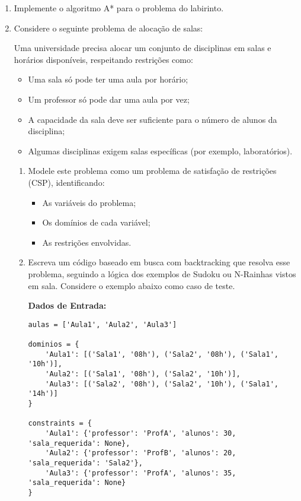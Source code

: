 \documentclass{article}
\begin{document}
\begin{enumerate}
    \item Implemente o algoritmo A* para o problema do labirinto. 
    \item Considere o seguinte problema de alocação de salas:

    Uma universidade precisa alocar um conjunto de disciplinas em salas e horários disponíveis, respeitando restrições como:
    \begin{itemize}
        \item Uma sala só pode ter uma aula por horário;
        \item Um professor só pode dar uma aula por vez;
        \item A capacidade da sala deve ser suficiente para o número de alunos da disciplina;
        \item Algumas disciplinas exigem salas específicas (por exemplo, laboratórios).
    \end{itemize}

    \begin{enumerate}
        \item Modele este problema como um problema de satisfação de restrições (CSP), identificando:
        \begin{itemize}
            \item As variáveis do problema;
            \item Os domínios de cada variável;
            \item As restrições envolvidas.
        \end{itemize}

        \item Escreva um código baseado em busca com backtracking que resolva esse problema, seguindo a lógica dos exemplos de Sudoku ou N-Rainhas vistos em sala. Considere o exemplo abaixo como caso de teste. 


\textbf{Dados de Entrada:}
\begin{verbatim}
aulas = ['Aula1', 'Aula2', 'Aula3']

dominios = {
    'Aula1': [('Sala1', '08h'), ('Sala2', '08h'), ('Sala1', '10h')],
    'Aula2': [('Sala1', '08h'), ('Sala2', '10h')],
    'Aula3': [('Sala2', '08h'), ('Sala2', '10h'), ('Sala1', '14h')]
}

constraints = {
    'Aula1': {'professor': 'ProfA', 'alunos': 30, 'sala_requerida': None},
    'Aula2': {'professor': 'ProfB', 'alunos': 20, 'sala_requerida': 'Sala2'},
    'Aula3': {'professor': 'ProfA', 'alunos': 35, 'sala_requerida': None}
}


\end{verbatim}
\end{enumerate}
\end{enumerate}
\end{document}

